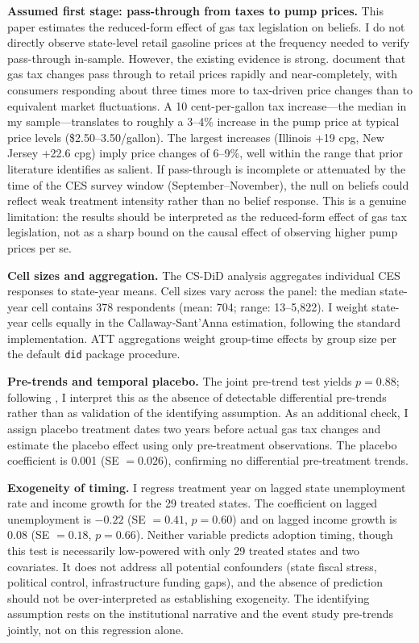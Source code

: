 \documentclass[12pt]{article}
\begin{document}
\textbf{Assumed first stage: pass-through from taxes to pump prices.} This paper estimates the reduced-form effect of gas tax legislation on beliefs. I do not directly observe state-level retail gasoline prices at the frequency needed to verify pass-through in-sample. However, the existing evidence is strong. \citet{li2014gasoline} document that gas tax changes pass through to retail prices rapidly and near-completely, with consumers responding about three times more to tax-driven price changes than to equivalent market fluctuations. A 10 cent-per-gallon tax increase---the median in my sample---translates to roughly a 3--4\% increase in the pump price at typical price levels (\$2.50--3.50/gallon). The largest increases (Illinois +19 cpg, New Jersey +22.6 cpg) imply price changes of 6--9\%, well within the range that prior literature identifies as salient. If pass-through is incomplete or attenuated by the time of the CES survey window (September--November), the null on beliefs could reflect weak treatment intensity rather than no belief response. This is a genuine limitation: the results should be interpreted as the reduced-form effect of gas tax legislation, not as a sharp bound on the causal effect of observing higher pump prices per se.

\textbf{Cell sizes and aggregation.} The CS-DiD analysis aggregates individual CES responses to state-year means. Cell sizes vary across the panel: the median state-year cell contains 378 respondents (mean: 704; range: 13--5,822). I weight state-year cells equally in the Callaway-Sant'Anna estimation, following the standard implementation. ATT aggregations weight group-time effects by group size per the default \texttt{did} package procedure.

\textbf{Pre-trends and temporal placebo.} The joint pre-trend test yields $p = 0.88$; following \citet{roth2023pretrends}, I interpret this as the absence of detectable differential pre-trends rather than as validation of the identifying assumption. As an additional check, I assign placebo treatment dates two years before actual gas tax changes and estimate the placebo effect using only pre-treatment observations. The placebo coefficient is 0.001 (SE $= 0.026$), confirming no differential pre-treatment trends.

\textbf{Exogeneity of timing.} I regress treatment year on lagged state unemployment rate and income growth for the 29 treated states. The coefficient on lagged unemployment is $-0.22$ (SE $= 0.41$, $p = 0.60$) and on lagged income growth is $0.08$ (SE $= 0.18$, $p = 0.66$). Neither variable predicts adoption timing, though this test is necessarily low-powered with only 29 treated states and two covariates. It does not address all potential confounders (state fiscal stress, political control, infrastructure funding gaps), and the absence of prediction should not be over-interpreted as establishing exogeneity. The identifying assumption rests on the institutional narrative and the event study pre-trends jointly, not on this regression alone.
\end{document}
